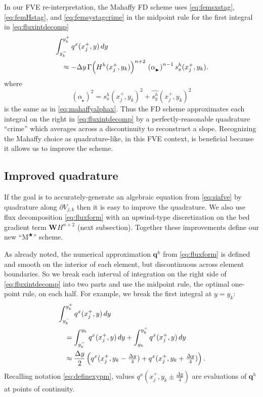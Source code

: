 \documentclass[twocolumn,letterpaper]{igs}
\newcommand\bq{\mathbf{q}}
\newcommand\bW{\mathbf{W}}
\newcommand{\Mstar}{$\text{M}^{\bigstar}$\xspace}
\newcommand\alpharight{\alpha_{{}_{\blacktriangleright}}}
\begin{document}
In our FVE re-interpretation, the Mahaffy FD scheme uses \eqref{eq:femsxstag}, \eqref{eq:femHstag}, and \eqref{eq:femsystagcrime} in the midpoint rule for the first integral in \eqref{eq:fluxintdecomp}
\begin{align}
&\int_{y_k^-}^{y_k^+} q^x(x_j^+,y)\,dy  \label{eq:femmahaffyfirstint} \\
  &\quad\approx - \Delta y\, \Gamma \Big(H^h(x_j^+,y_k)\Big)^{n+2} \,\left(\alpharight\right)^{n-1} s^h_x(x_j^+,y_k). \notag 
\end{align}
where
\begin{equation}
\left(\alpharight\right)^2 = s^h_x(x_j^+,y_k)^2 + \widehat{s^h_y}(x_j^+,y_k)^2
\end{equation}
is the same as in \eqref{eq:mahaffyalphax}.  Thus the FD scheme approximates each integral on the right in \eqref{eq:fluxintdecomp} by a perfectly-reasonable quadrature ``crime'' \citep[compare][]{Strang1972} which averages across a discontinuity to reconstruct a slope.  Recognizing the Mahaffy choice as quadrature-like, in this FVE context, is beneficial because it allows us to improve the scheme.


\subsection{Improved quadrature}

If the goal is to accurately-generate an algebraic equation from \eqref{eq:siafve} by quadrature along $\partial V_{j,k}$ then it is easy to improve the quadrature.  We also use flux decomposition \eqref{eq:fluxform} with an upwind-type discretization on the bed gradient term $\bW H^{n+2}$ (next subsection).  Together these improvements define our new ``\Mstar'' scheme.

As already noted, the numerical approximation $\bq^h$ from \eqref{eq:fluxform} is defined and smooth on the interior of each element, but discontinuous across element boundaries.  So we break each interval of integration on the right side of \eqref{eq:fluxintdecomp} into two parts and use the midpoint rule, the optimal one-point rule, on each half.  For example, we break the first integral at $y=y_k$:
\begin{align}
&\int_{y_k^-}^{y_k^+} q^x(x_j^+,y)\,dy  \label{eq:starbreakfirst} \\
  &\quad= \int_{y_k^-}^{y_k} q^x(x_j^+,y)\,dy + \int_{y_k}^{y_k^+} q^x(x_j^+,y)\,dy \notag \\
  &\quad\approx \frac{\Delta y}{2} \left(q^x(x_j^+,y_k-\tfrac{\Delta y}{4}) + q^x(x_j^+,y_k+\tfrac{\Delta y}{4})\right). \notag
\end{align}
Recalling notation \eqref{eq:definexypm}, values $q^x(x_j^+,y_k\pm\tfrac{\Delta y}{4})$ are evaluations of $\bq^h$ at points of continuity.
\end{document}
